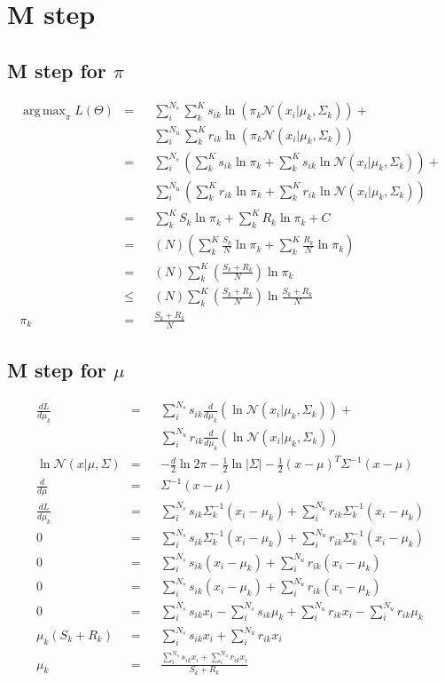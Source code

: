 \documentclass[11pt]{article}
\DeclareMathOperator*{\argmax}{arg\,max}
\begin{document}
\section{M step}
\subsection{M step for $\pi$}
\begin{align}
\argmax_\pi L(\Theta) &=&& \sum_i^{N_s} \sum_k^{K} s_{ik} \ln(\pi_k \mathcal{N}(x_i | \mu_k, \Sigma_k)) + \\
 & &&\sum_i^{N_u} \sum_k^{K} r_{ik} \ln(\pi_k \mathcal{N}(x_i | \mu_k, \Sigma_k))\\
&=&& \sum_i^{N_s}(\sum_k^K s_{ik} \ln \pi_k + \sum_k^K s_{ik} \ln \mathcal{N}(x_i | \mu_k, \Sigma_k)) +\\
& && \sum_i^{N_u}(\sum_k^K r_{ik} \ln \pi_k + \sum_k^K r_{ik} \ln \mathcal{N}(x_i | \mu_k, \Sigma_k))\\
&=&& \sum_k^K S_k\ln\pi_k + \sum_k^K R_k\ln\pi_k + C\\
&=&& (N) (\sum_k^K \frac{S_k}{N} \ln \pi_k + \sum_k^K \frac{R_k}{N} \ln \pi_k)\\
&=&& (N) \sum_k^K (\frac{S_k + R_k}{N}) \ln \pi_k\\
&\leq&& (N) \sum_k^K (\frac{S_k + R_k}{N}) \ln \frac{S_k+R_k}{N}\\
\pi_k &=&& \frac{S_k+R_k}{N}
\end{align}

\subsection{M step for $\mu$}
\begin{align}
\frac{dL}{d\mu_k} &=&& \sum_i^{N_s} s_{ik} \frac{d}{d\mu_k}(\ln \mathcal{N}(x_i|\mu_k, \Sigma_k)) + \\
& &&\sum_i^{N_u} r_{ik} \frac{d}{d\mu_k}(\ln \mathcal{N}(x_i|\mu_k, \Sigma_k))\\
\ln \mathcal{N}(x | \mu, \Sigma) &=&& -\frac{d}{2}\ln 2\pi - \frac{1}{2}\ln |\Sigma| - \frac{1}{2}(x-\mu)^T\Sigma^{-1}(x-\mu)\\
\frac{d}{d\mu} &=&& \Sigma^{-1}(x-\mu)\\
\frac{dL}{d\mu_k} &=&& \sum_i^{N_s} s_{ik} \Sigma_k^{-1}(x_i-\mu_k) + \sum_i^{N_u} r_{ik} \Sigma_k^{-1}(x_i-\mu_k)\\
0 &=&& \sum_i^{N_s} s_{ik}\Sigma_k^{-1}(x_i-\mu_k) + \sum_i^{N_u} r_{ik}\Sigma_k^{-1}(x_i-\mu_k)\\
0 &=&& \sum_i^{N_s} s_{ik}(x_i-\mu_k)              + \sum_i^{N_u} r_{ik}(x_i-\mu_k)\\
0 &=&& \sum_i^{N_s} s_{ik}(x_i-\mu_k)              + \sum_i^{N_u} r_{ik}(x_i-\mu_k)\\
0 &=&& \sum_i^{N_s} s_{ik}x_i - \sum_i^{N_s}s_{ik}\mu_k + \sum_i^{N_u} r_{ik}x_i - \sum_i^{N_u}r_{ik}\mu_k\\
\mu_k(S_k + R_k) &=&& \sum_i^{N_s}s_{ik}x_i + \sum_i^{N_u}r_{ik}x_i\\
\mu_k &=&& \frac{\sum_i^{N_s}s_{ik}x_i + \sum_i^{N_u}r_{ik}x_i}{S_k + R_k}
\end{align}
\end{document}
